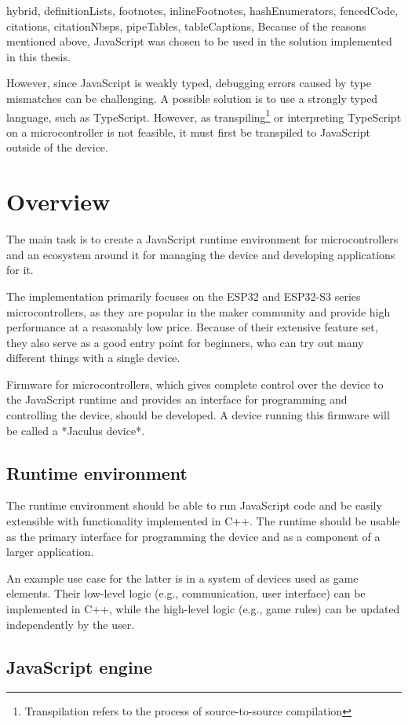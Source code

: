 \begin{markdown*}{%
  hybrid,
  definitionLists,
  footnotes,
  inlineFootnotes,
  hashEnumerators,
  fencedCode,
  citations,
  citationNbsps,
  pipeTables,
  tableCaptions,
}
Because of the reasons mentioned above, JavaScript was chosen to be used in the solution implemented in this thesis.

However, since JavaScript is weakly typed, debugging errors caused by type mismatches can be challenging. A possible solution is to use a strongly typed language, such as TypeScript. However, as transpiling\footnote{Transpilation refers to the process of source-to-source compilation} or interpreting TypeScript on a microcontroller is not feasible, it must first be transpiled to JavaScript outside of the device.


\chapter{Overview}

The main task is to create a JavaScript runtime environment for microcontrollers and an ecosystem around it for managing the device and developing applications for it.

The implementation primarily focuses on the ESP32 and ESP32-S3 series microcontrollers, as they are popular in the maker community and provide high performance at a reasonably low price. Because of their extensive feature set, they also serve as a good entry point for beginners, who can try out many different things with a single device.

Firmware for microcontrollers, which gives complete control over the device to the JavaScript runtime and provides an interface for programming and controlling the device, should be developed. A device running this firmware will be called a *Jaculus device*.

\section{Runtime environment}

The runtime environment should be able to run JavaScript code and be easily extensible with functionality implemented in C++. The runtime should be usable as the primary interface for programming the device and as a component of a larger application.

An example use case for the latter is in a system of devices used as game elements. Their low-level logic (e.g., communication, user interface) can be implemented in C++, while the high-level logic (e.g., game rules) can be updated independently by the user.

\section{JavaScript engine}


\end{markdown*}
